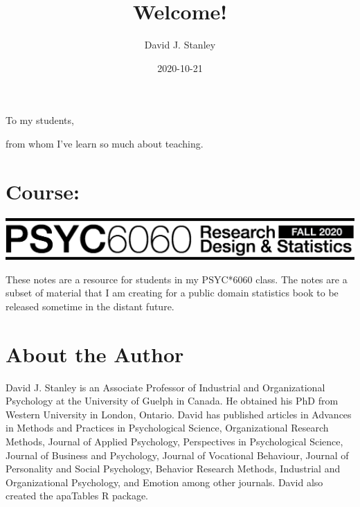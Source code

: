 \documentclass[
]{krantz}
\title{Welcome!}
\author{David J. Stanley}
\date{2020-10-21}
\begin{document}
\maketitle


\thispagestyle{empty}

\begin{center}
To my students,

from whom I've learn so much about teaching.
\end{center}

\setlength{\abovedisplayskip}{-5pt}
\setlength{\abovedisplayshortskip}{-5pt}

{
\hypersetup{linkcolor=}
\setcounter{tocdepth}{2}
\tableofcontents
}
\listoftables
\listoffigures
\hypertarget{course}{%
\chapter*{Course:}\label{course}}


\includegraphics[width=1\linewidth]{header_6060}

These notes are a resource for students in my PSYC*6060 class. The notes are a subset of material that I am creating for a public domain statistics book to be released sometime in the distant future.

\hypertarget{about-the-author}{%
\chapter*{About the Author}\label{about-the-author}}


David J. Stanley is an Associate Professor of Industrial and Organizational Psychology at the University of Guelph in Canada. He obtained his PhD from Western University in London, Ontario. David has published articles in Advances in Methods and Practices in Psychological Science, Organizational Research Methods, Journal of Applied Psychology, Perspectives in Psychological Science, Journal of Business and Psychology, Journal of Vocational Behaviour, Journal of Personality and Social Psychology, Behavior Research Methods, Industrial and Organizational Psychology, and Emotion among other journals. David also created the apaTables R package.
\end{document}

